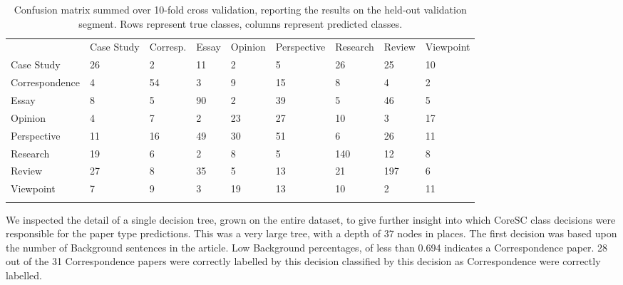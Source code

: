 \documentclass{svmult}
\begin{document}
\begin{table}

\vspace{-10pt}

\caption{Confusion matrix summed over 10-fold cross validation, reporting the results on the held-out validation segment. Rows represent true classes, columns represent predicted classes.}
\label{tab:confusion}       %

\begin{tabular}{lllllllll}
\hline\noalign{\smallskip}
      &  Case Study   &     Corresp.      &   Essay  & Opinion &     Perspective    &     Research    &     Review  & Viewpoint \\
\noalign{\smallskip}\svhline\noalign{\smallskip}
Case Study    &    26   &     2     &   11    &    2  &      5 & 26       & 25 &       10 \\
Correspondence  &      4  &      54   &     3    &    9     &   15 & 8   &     4 &       2 \\
Essay      &  8     &   5    &   90    &    2 &       39      &  5 & 46    &    5 \\
Opinion    &    4   &     7 &       2   &     23      &  27     &   10   &  3  &      17 \\
Perspective &       11  &      16    &    49       & 30      &  51 & 6      &  26    &   11 \\
Research      &  19    &    6 &       2 &       8    &    5      &  140  &   12    &    8\\
Review       & 27     &   8     &   35    &    5      &  13    &    21   &  197 &       6\\
Viewpoint    &    7  &      9   &     3     &   19     &   13 & 10     &   2  &      11 \\
\noalign{\smallskip}\hline\noalign{\smallskip}
\end{tabular}
\vspace{-15pt}
\end{table}




We inspected the detail of a single decision tree, grown on the entire dataset,
to give further insight into which CoreSC class decisions were responsible for
the paper type predictions. This was a very large tree, with a depth of 37
nodes in places.  The first decision was based upon the number of Background
sentences in the article. Low Background percentages, of less than 0.694
indicates a Correspondence paper. 28 out of the 31 Correspondence papers were
correctly labelled by this decision  classified by this decision as
Correspondence were correctly labelled.
\end{document}
